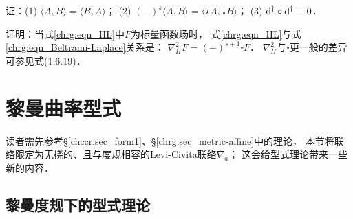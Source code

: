 \begin{exercise}
	证：(1) $\langle A,B\rangle = \langle B, A \rangle$；
	(2) $(-)^s\langle A,B\rangle = \langle \star A, \star B \rangle$；
	(3) ${\rm d}^{\dagger} \circ {\rm d}^{\dagger}\equiv 0$．
\end{exercise}

\begin{exercise}
证明：当式\eqref{chrg:eqn_HL}中$F$为标量函数场时，
式\eqref{chrg:eqn_HL}与式\eqref{chrg:eqn_Beltrami-Laplace}关系是：
$\nabla^2_H F = (-)^{s+1}\square F$．
$\nabla^2_H$与$\square$更一般的差异可参见\parencite{Luqk-2026}式(1.6.19)．
\end{exercise}



\section{黎曼曲率型式}\label{chrg:sec_form2}

读者需先参考\S\ref{chccr:sec_form1}、\S\ref{chrg:sec_metric-affine}中的理论，
本节将联络限定为无挠的、且与度规相容的Levi-Civita联络$\nabla_a$；
这会给型式理论带来一些新的内容．



\subsection{黎曼度规下的型式理论}



